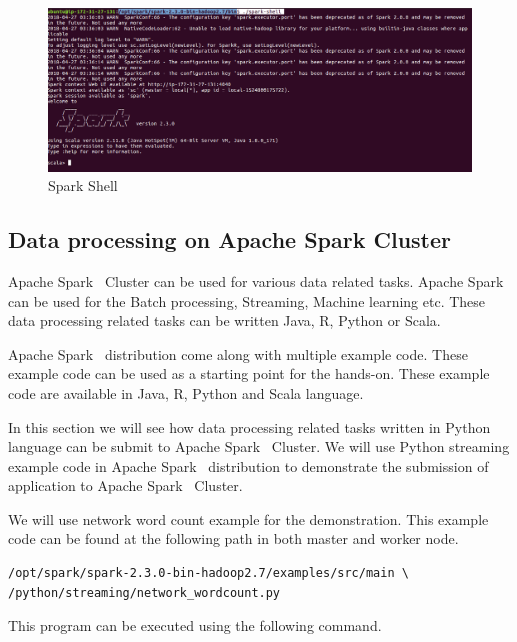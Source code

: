 \begin{figure}[!ht]
	\centering\includegraphics[width=\columnwidth]{images/sparkshell.png}
	\caption{Spark Shell}\label{f:spark-shell}
\end{figure}

\subsection{Data processing on Apache Spark Cluster}\label{s:steps-data}

Apache Spark~\cite{hid-sp18-511-www-spark} Cluster can be used for
various data related tasks.  Apache
Spark~\cite{hid-sp18-511-www-spark} can be used for the Batch
processing, Streaming, Machine learning etc. These data processing
related tasks can be written Java, R, Python or Scala.

Apache Spark~\cite{hid-sp18-511-www-spark} distribution come along
with multiple example code. These example code can be used as a
starting point for the hands-on. These example code are available in
Java, R, Python and Scala language.

In this section we will see how data processing related tasks written
in Python language can be submit to Apache
Spark~\cite{hid-sp18-511-www-spark} Cluster. We will use Python
streaming example code in Apache Spark~\cite{hid-sp18-511-www-spark}
distribution to demonstrate the submission of application to Apache
Spark~\cite{hid-sp18-511-www-spark} Cluster.

We will use network word count example for the demonstration. This
example code can be found at the following path in both master and
worker node.

\begin{verbatim}
/opt/spark/spark-2.3.0-bin-hadoop2.7/examples/src/main \
/python/streaming/network_wordcount.py
\end{verbatim}

This program can be executed using the following command.

